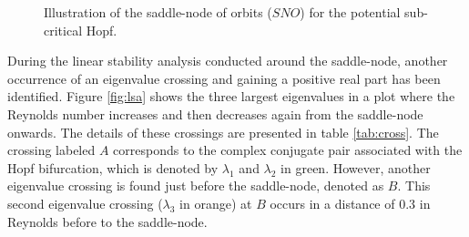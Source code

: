 \begin{figure}[ht]
\centering
{}
\caption{Illustration of the saddle-node of orbits ($SNO$) for the potential sub-critical Hopf.} 
\label{fig:sub_hopf_sketch}
\end{figure}

During the linear stability analysis conducted around the saddle-node, another
occurrence of an eigenvalue crossing and gaining a positive real part has been
identified. Figure \ref{fig:lsa} shows the three largest eigenvalues in a plot
where the Reynolds number increases and then decreases again from the
saddle-node onwards. The details of these crossings are presented in table
\ref{tab:cross}. The crossing labeled $A$ corresponds to the complex conjugate
pair associated with the Hopf bifurcation, which is denoted by $\lambda_1$ and
$\lambda_2$ in green. However, another eigenvalue crossing is found just before
the saddle-node, denoted as $B$. This second eigenvalue crossing ($\lambda_3$
in orange) at $B$ occurs in a distance of $0.3$ in Reynolds before to the
saddle-node. \\\\


